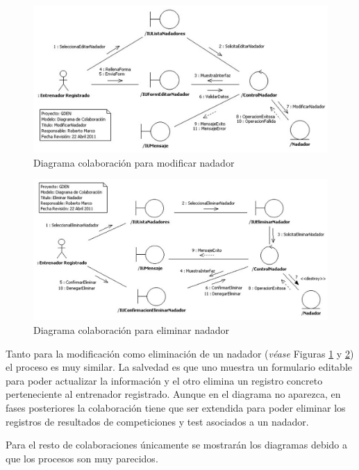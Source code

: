 			\begin{figure}[H]
			  \centering
			    \includegraphics[width=16cm]{./eps/colaboraciones/gestion_nadadores/ModificarNadador.eps}
			  \caption{Diagrama colaboración para modificar nadador}
			  \label{fig:col_modificar_nadador}
			\end{figure}
			
			\begin{figure}[H]
			  \centering
			    \includegraphics[width=16cm]{./eps/colaboraciones/gestion_nadadores/EliminarNadador.eps}
			  \caption{Diagrama colaboración para eliminar nadador}
			  \label{fig:col_eliminar_nadador}
			\end{figure}
		
		Tanto para la modificación como eliminación de un nadador ({\it véase} Figuras \ref{fig:col_modificar_nadador} y \ref{fig:col_eliminar_nadador}) el proceso es muy similar. La salvedad es que uno muestra un formulario editable para poder actualizar la información y el otro elimina un registro concreto perteneciente al entrenador registrado. Aunque en el diagrama no aparezca, en fases posteriores la colaboración tiene que ser extendida para poder eliminar los registros de resultados de competiciones y test asociados a un nadador.
		
		Para el resto de colaboraciones únicamente se mostrarán los diagramas debido a que los procesos son muy parecidos.
			
